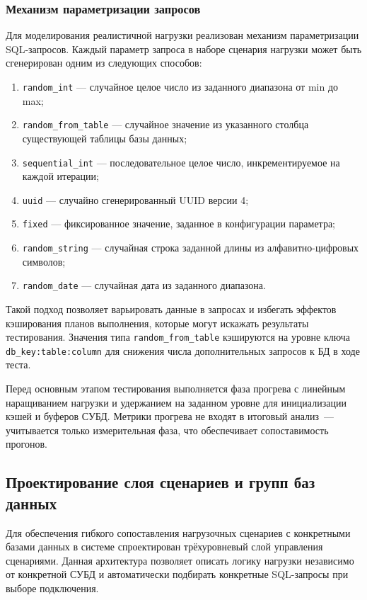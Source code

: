 \subsubsection{Механизм параметризации запросов}

Для моделирования реалистичной нагрузки реализован механизм параметризации SQL-запросов. Каждый параметр запроса в наборе сценария нагрузки может быть сгенерирован одним из следующих способов:

\begin{enumerate}[label=\arabic*)]
    \item \texttt{random\_int} --- случайное целое число из заданного диапазона от min до max;
    \item \texttt{random\_from\_table} --- случайное значение из указанного столбца существующей таблицы базы данных;
    \item \texttt{sequential\_int} --- последовательное целое число, инкрементируемое на каждой итерации;
    \item \texttt{uuid} --- случайно сгенерированный UUID версии 4;
    \item \texttt{fixed} --- фиксированное значение, заданное в конфигурации параметра;
    \item \texttt{random\_string} --- случайная строка заданной длины из алфавитно-цифровых символов;
    \item \texttt{random\_date} --- случайная дата из заданного диапазона.
\end{enumerate}

Такой подход позволяет варьировать данные в запросах и избегать эффектов кэширования планов выполнения, которые могут искажать результаты тестирования. Значения типа \texttt{random\_from\_table} кэшируются на уровне ключа \texttt{db\_key:table:column} для снижения числа дополнительных запросов к БД в ходе теста.

Перед основным этапом тестирования выполняется фаза прогрева с линейным наращиванием нагрузки и удержанием на заданном уровне для инициализации кэшей и буферов СУБД. Метрики прогрева не входят в итоговый анализ~--- учитывается только измерительная фаза, что обеспечивает сопоставимость прогонов.

\subsection{Проектирование слоя сценариев и групп баз данных}

Для обеспечения гибкого сопоставления нагрузочных сценариев с конкретными базами данных в системе спроектирован трёхуровневый слой управления сценариями. Данная архитектура позволяет описать логику нагрузки независимо от конкретной СУБД и автоматически подбирать конкретные SQL-запросы при выборе подключения.

